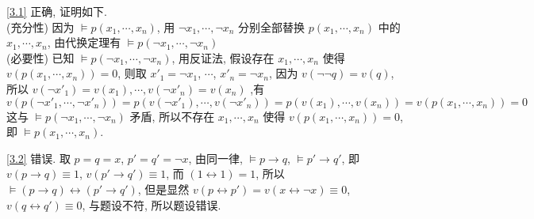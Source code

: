 \documentclass[boxes]{homework}
\begin{document}
\begin{solution}
    \ref{3.1} 正确, 证明如下.\\
    (充分性) 因为 $\vDash p(x_1, \cdots, x_n)$, 用 $\lnot x_1, \cdots, \lnot x_n$ 分别全部替换 $p(x_1, \cdots, x_n)$ 中的 $x_1, \cdots, x_n$, 由代换定理有 $\vDash p(\lnot x_1, \cdots, \lnot x_n)$\\
    (必要性) 已知 $\vDash p(\lnot x_1, \cdots, \lnot x_n)$, 用反证法, 假设存在 $x_1, \cdots, x_n$ 使得 $v(p(x_1, \cdots, x_n)) = 0$, 则取 $x'_1 = \lnot x_1$, $\cdots$, $x'_n = \lnot x_n$, 因为 $v(\lnot \lnot q) = v(q)$, 所以 $v(\lnot x'_1) = v(x_1), \cdots, v(\lnot x'_n) = v(x_n)$ ,有
    \begin{equation*}
        v(p(\lnot x'_1, \cdots, \lnot x'_n)) = p(v(\lnot x'_1), \cdots, v(\lnot x'_n)) = p(v(x_1), \cdots, v(x_n)) = v(p(x_1, \cdots, x_n)) = 0
    \end{equation*}
    这与 $\vDash p(\lnot x_1, \cdots, \lnot x_n)$ 矛盾, 所以不存在 $x_1, \cdots, x_n$ 使得 $v(p(x_1, \cdots, x_n)) = 0$, 即 $\vDash p(x_1, \cdots, x_n)$.
    
    \ref{3.2} 错误. 取 $p = q = x$, $p' = q' = \lnot x$, 由同一律, $\vDash p\to q$, $\vDash p'\to q'$, 即 $v(p\to q) \equiv 1$, $v(p'\to q') \equiv 1$, 而 $(1\leftrightarrow 1) = 1$, 所以 $\vDash (p\to q)\leftrightarrow(p'\to q')$, 但是显然 $v(p\leftrightarrow p')=v(x\leftrightarrow\lnot x) \equiv 0$, $v(q\leftrightarrow q') \equiv 0$, 与题设不符, 所以题设错误.
\end{solution}
\end{document}
